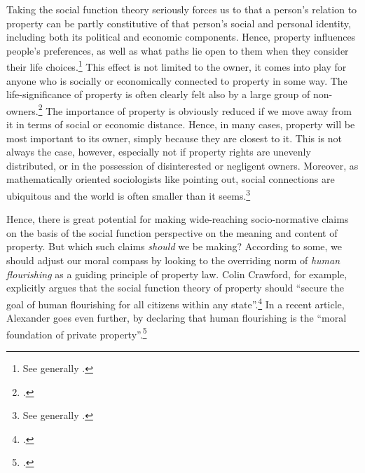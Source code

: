Taking the social function theory seriously forces us to  that a person's relation to property can be partly constitutive of that person's social and personal identity, including both its political and economic components. Hence, property influences people's preferences, as well as what paths lie open to them when they consider their life choices.\footnote{See generally \cite{alexander09}.} This effect is not limited to the owner, it comes into play for anyone who is socially or economically connected to property in some way. The life-significance of property is often clearly felt also by a large group of non-owners.\footcite[128-129]{alexander09d} The importance of property is obviously reduced if we move away from it in terms of social or economic distance. Hence, in many cases, property will be most important to its owner, simply because they are closest to it. This is not always the case, however, especially not if property rights are unevenly distributed, or in the possession of disinterested or negligent owners. Moreover, as mathematically oriented sociologists like pointing out, social connections are ubiquitous and the world is often smaller than it seems.\footnote{See generally \cite{schnettler09}.}

Hence, there is great potential for making wide-reaching socio-normative claims on the basis of the social function perspective on the meaning and content of property. But which such claims {\it should} we be making? According to some, we should adjust our moral compass by looking to the overriding norm of {\it human flourishing} as a guiding principle of property law. Colin Crawford, for example, explicitly argues that the social function theory of property should ``secure the goal of human flourishing for all citizens within any state''.\footcite[1089]{crawford11} In a recent article, Alexander goes even further, by declaring that human flourishing is the ``moral foundation of private property''.\footcite[1261]{alexander14} 

